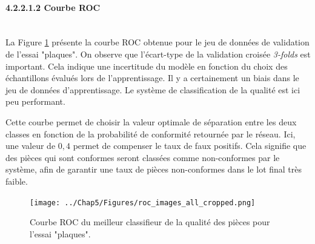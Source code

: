 \vspace{1cm}

\paragraph{4.2.2.1.2 Courbe ROC} \mbox{} \\
La Figure \ref{fig:po_roc} présente la courbe ROC obtenue pour le jeu de données de validation de l'essai "plaques".
On observe que l'écart-type de la validation croisée \textit{3-folds} est important.
Cela indique une incertitude du modèle en fonction du choix des échantillons évalués lors de l'apprentissage.
Il y a certainement un biais dans le jeu de données d'apprentissage.
Le système de classification de la qualité est ici peu performant.

Cette courbe permet de choisir la valeur optimale de séparation entre les deux classes en fonction de la probabilité de conformité retournée par le réseau.
Ici, une valeur de $0,4$ permet de compenser le taux de faux positifs.
Cela signifie que des pièces qui sont conformes seront classées comme non-conformes par le système, afin de garantir une taux de pièces non-conformes dans le lot final très faible.

\begin{figure}[p!]
	\centering
	\texttt{[image: ../Chap5/Figures/roc\_images\_all\_cropped.png]}
	\caption{Courbe ROC du meilleur classifieur de la qualité des pièces pour l'essai "plaques".}
	\label{fig:po_roc}
\end{figure}

\FloatBarrier